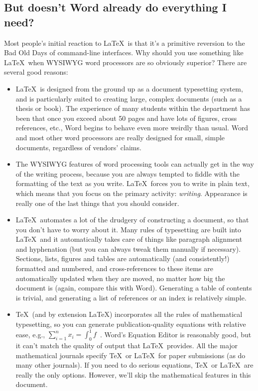 \documentclass[12pt,a4paper,pdftex]{article}
\begin{document}
\subsection{But doesn't Word already do everything I need?}
\label{sec-Word}

Most people's initial reaction to \LaTeX\ is that it's a primitive reversion to the Bad Old Days of command-line interfaces. Why should you use something like \LaTeX\ when WYSIWYG word processors are so obviously superior? There are several good reasons:

\begin{itemize}

	\item \LaTeX\ is designed from the ground up as a document typesetting system, and is particularly suited to creating large, complex documents (such as a thesis or book). The experience of many students within the department has been that once you exceed about 50 pages and have lots of figures, cross references, etc., Word begins to behave even more weirdly than usual. Word and most other word processors are really designed for small, simple documents, regardless of vendors' claims.
	
	\item The WYSIWYG features of word processing tools can actually get in the way of the writing process, because you are always tempted to fiddle with the formatting of the text as you write. \LaTeX\ forces you to write in plain text, which means that you focus on the primary activity: \emph{writing}. Appearance is really one of the last things that you should consider.
	
	\item \LaTeX\ automates a lot of the drudgery of constructing a document, so that you don't have to worry about it. Many rules of typesetting are built into \LaTeX\, and it automatically takes care of things like paragraph alignment and hyphenation (but you can always tweak them manually if necessary). Sections, lists, figures and tables are automatically (and consistently!) formatted and numbered, and cross-references to these items are automatically updated when they are moved, no matter how big the document is (again, compare this with Word). Generating a table of contents is trivial, and generating a list of references or an index is relatively simple.
	
	\item \TeX\ (and by extension \LaTeX) incorporates all the rules of mathematical typesetting, so you can generate publication-quality equations with relative ease, e.g., \(\sum_{i=1}^{n} x_{i} = \int_{0}^{1} f\)~\cite{UsersGuide}. Word's Equation Editor is reasonably good, but it can't match the quality of output that \LaTeX\ provides. All the major mathematical journals specify \TeX\ or \LaTeX\ for paper submissions (as do many other journals). If you need to do serious equations, \TeX\ or \LaTeX\ are really the only options. However, we'll skip the mathematical features in this document.
	

\end{itemize}
\end{document}
